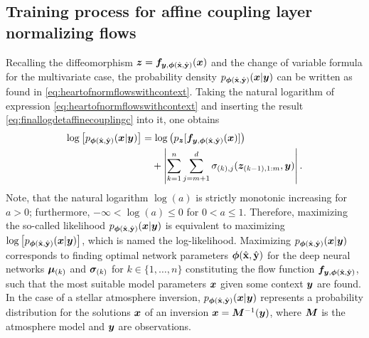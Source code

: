 \documentclass[a4paper,12pt]{report}
\begin{document}
\subsection{Training process for affine coupling layer normalizing flows}
Recalling the diffeomorphism $\bm{z} = \bm{f}_{\bm{y},\bm{\phi}(\hat{\boldsymbol{\mathbf{x}}},\hat{\boldsymbol{\mathbf{y}}})}(\bm{x})$ and the change of variable formula for the multivariate case, the probability density $p_{\bm{\phi}(\hat{\boldsymbol{\mathbf{x}}},\hat{\boldsymbol{\mathbf{y}}})}(\bm{x}|\bm{y})$ can be written as found in \cref{eq:heartofnormflowswithcontext}. Taking the natural logarithm of expression \cref{eq:heartofnormflowswithcontext} and inserting the result \cref{eq:finallogdetaffinecouplingc} into it, one obtains
\begin{align}\begin{aligned}
\log\left[p_{\bm{\phi}(\hat{\boldsymbol{\mathbf{x}}},\hat{\boldsymbol{\mathbf{y}}})}(\bm{x}|\bm{y})\right] &= \log\left(p_{\bm{z}}[\bm{f}_{\bm{y},\bm{\phi}(\hat{\boldsymbol{\mathbf{x}}},\hat{\boldsymbol{\mathbf{y}}})}(\bm{x})]\right) \\ &\quad + \left|\sum_{k = 1}^{n}\sum_{j = m+1}^{d}\sigma_{(k),j}(\bm{z}_{(k-1),1:m},\bm{y})\right|.
\end{aligned}\end{align} Note, that the natural logarithm $\log(a)$ is strictly monotonic increasing for $a > 0$; furthermore, $-\infty < \log(a) \leq 0$ for $ 0 < a \leq 1$. Therefore, maximizing the so-called likelihood $p_{\bm{\phi}(\hat{\boldsymbol{\mathbf{x}}},\hat{\boldsymbol{\mathbf{y}}})}(\bm{x}|\bm{y})$ is equivalent to maximizing $\log\left[p_{\bm{\phi}(\hat{\boldsymbol{\mathbf{x}}},\hat{\boldsymbol{\mathbf{y}}})}(\bm{x}|\bm{y})\right]$, which is named the log-likelihood. Maximizing $p_{\bm{\phi}(\hat{\boldsymbol{\mathbf{x}}},\hat{\boldsymbol{\mathbf{y}}})}(\bm{x}|\bm{y})$ corresponds to finding optimal network parameters $\bm{\phi}(\hat{\boldsymbol{\mathbf{x}}},\hat{\boldsymbol{\mathbf{y}}})$ for the deep neural networks $\bm{\mu}_{(k)}$ and $\bm{\sigma}_{(k)}$ for $k \in\{1,\dots,n\}$ constituting the flow function $\bm{f}_{\bm{y},\bm{\phi}(\hat{\boldsymbol{\mathbf{x}}},\hat{\boldsymbol{\mathbf{y}}})}$, such that the most suitable model parameters $\bm{x}$ given some context $\bm{y}$ are found. In the case of a stellar atmosphere inversion, $p_{\bm{\phi}(\hat{\boldsymbol{\mathbf{x}}},\hat{\boldsymbol{\mathbf{y}}})}(\bm{x}|\bm{y})$ represents a probability distribution for the solutions $\bm{x}$ of an inversion $\bm{x} = \bm{M}^{-1}(\bm{y})$, where $\bm{M}$ is the atmosphere model and $\bm{y}$ are observations.
\end{document}
